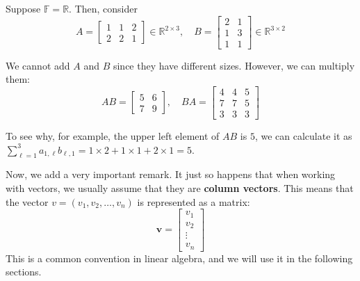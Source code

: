 \documentclass[../lecture-notes-148x210.tex]{subfiles}
\begin{document}
\begin{example}
    Suppose $\mathbb{F} = \mathbb{R}$. Then, consider 
    \begin{equation*}
        A = \begin{bmatrix}
            1 & 1 & 2 \\
            2 & 2 & 1
        \end{bmatrix} \in \mathbb{R}^{2 \times 3}, \quad B = \begin{bmatrix}
            2 & 1 \\
            1 & 3 \\
            1 & 1
        \end{bmatrix} \in \mathbb{R}^{3 \times 2}
    \end{equation*}

    We cannot add $A$ and $B$ since they have different sizes. However, we can multiply them:
    \begin{equation*}
        AB = \begin{bmatrix}
            5 & 6 \\ 7 & 9
        \end{bmatrix}, \quad BA = \begin{bmatrix}
            4 & 4 & 5 \\
            7 & 7 & 5 \\
            3 & 3 & 3
        \end{bmatrix}
    \end{equation*}

    To see why, for example, the upper left element of $AB$ is $5$, we can calculate it as $\sum_{\ell=1}^3 a_{1,\ell}b_{\ell,1} = 1 \times 2 + 1 \times 1 + 2 \times 1 = 5$.
\end{example}

\begin{remark}
    Now, we add a very important remark. It just so happens that when working with vectors, we usually assume that they are \textbf{column vectors}. This means that the vector $v = (v_1,v_2,\dots,v_n)$ is represented as a matrix:
    \begin{equation*}
        \mathbf{v} = \begin{bmatrix} v_1 \\ v_2 \\ \vdots \\ v_n \end{bmatrix}
    \end{equation*} 
    This is a common convention in linear algebra, and we will use it in the following sections.
\end{remark}
\end{document}

